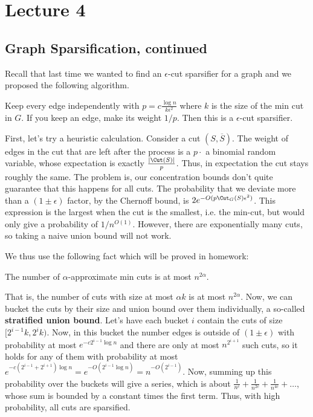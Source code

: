 \section{Lecture 4}
\subsection{Graph Sparsification, continued}
Recall that last time we wanted to find an $\epsilon$-cut sparsifier for a graph
and we proposed the following algorithm.
\begin{algothm}
    Keep every edge independently with $p = c \frac{\log n}{k \epsilon^2}$
    where $k$ is the size of the min cut in $G$. If you keep an edge,
    make its weight $1/p$. Then this is a $\epsilon$-cut sparsifier.
    \begin{proof*}
        First, let's try a heuristic calculation. Consider
        a cut $(S, \overline{S})$. The weight of edges in the cut
        that are left after the process is a $p \cdot$ a binomial random variable,
        whose expectation is exactly $\frac{|\Cut(S)|}{p}$. Thus, in expectation
        the cut stays roughly the same. The problem is, 
        our concentration bounds don't quite guarantee that this happens for all cuts.
        The probability that we deviate more than a $(1 \pm \epsilon)$ factor,
        by the Chernoff bound, is $2e^{-O(p \Cut_G(S) \epsilon^2)}$. This expression is the largest when
        the cut is the smallest, i.e. the min-cut, but would only give a probability of $1/n^{O(1)}$.
        However, there are exponentially many cuts, so taking a naive union bound will not work.

        We thus use the following fact which will be proved in homework:
        \begin{fact}
            The number of $\alpha$-approximate min cuts is at most $n^{2\alpha}$.
        \end{fact}
        That is, the number of cuts with size at most $\alpha k$ is at most $n^{2\alpha}$.
        Now, we can bucket the cuts by their size and union bound over them individually,
        a so-called \textbf{stratified union bound}.
        Let's have each bucket $i$ contain the cuts of size $[2^{i - 1}k, 2^{i}k)$.
        Now, in this bucket the number edges is outside of $(1 \pm \epsilon)$
        with probability at most $e^{-c 2^{i - 1} \log n}$ and there are only at most $n^{2^{i + 1}}$
        such cuts, so it holds for any of them with probability at most $e^{-c (2^{i - 1} + 2^{i + 1}) \log n} = e^{-O(2^{i - 1} \log n)} = n^{-O(2^{i - 1})}$.
        Now, summing up this probability over the buckets will give a series,
        which is about $\frac{1}{n^{c}} + \frac{1}{n^{2c}} + \frac{1}{n^{4c}} + \dots$, whose sum is bounded by a constant times the first term.
        Thus, with high probability, all cuts are sparsified.
    \end{proof*}
\end{algothm}

